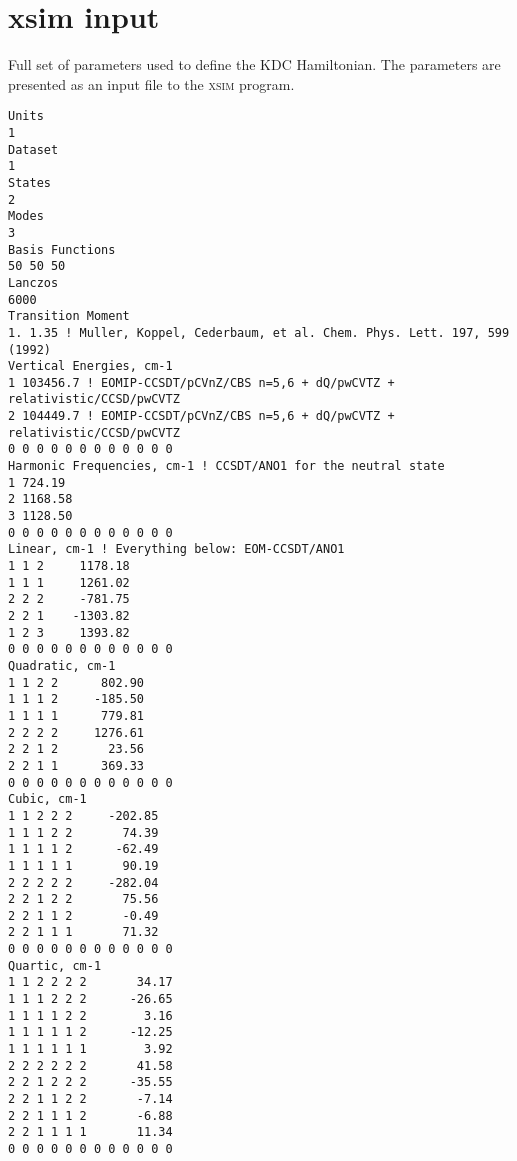 \documentclass[12pt,prb,aps]{revtex4-1}
\begin{document}
\section{xsim input}
Full set of parameters used to define the KDC Hamiltonian. The parameters are presented as an input file to the \textsc{xsim} program.
\begin{verbatim}
Units
1
Dataset
1
States
2
Modes
3
Basis Functions
50 50 50
Lanczos
6000
Transition Moment
1. 1.35 ! Muller, Koppel, Cederbaum, et al. Chem. Phys. Lett. 197, 599 (1992)
Vertical Energies, cm-1
1 103456.7 ! EOMIP-CCSDT/pCVnZ/CBS n=5,6 + dQ/pwCVTZ + relativistic/CCSD/pwCVTZ
2 104449.7 ! EOMIP-CCSDT/pCVnZ/CBS n=5,6 + dQ/pwCVTZ + relativistic/CCSD/pwCVTZ
0 0 0 0 0 0 0 0 0 0 0 0
Harmonic Frequencies, cm-1 ! CCSDT/ANO1 for the neutral state
1 724.19
2 1168.58
3 1128.50
0 0 0 0 0 0 0 0 0 0 0 0
Linear, cm-1 ! Everything below: EOM-CCSDT/ANO1
1 1 2     1178.18
1 1 1     1261.02
2 2 2     -781.75
2 2 1    -1303.82
1 2 3     1393.82
0 0 0 0 0 0 0 0 0 0 0 0
Quadratic, cm-1
1 1 2 2      802.90
1 1 1 2     -185.50
1 1 1 1      779.81
2 2 2 2     1276.61
2 2 1 2       23.56
2 2 1 1      369.33
0 0 0 0 0 0 0 0 0 0 0 0
Cubic, cm-1
1 1 2 2 2     -202.85
1 1 1 2 2       74.39
1 1 1 1 2      -62.49
1 1 1 1 1       90.19
2 2 2 2 2     -282.04
2 2 1 2 2       75.56
2 2 1 1 2       -0.49
2 2 1 1 1       71.32
0 0 0 0 0 0 0 0 0 0 0 0
Quartic, cm-1
1 1 2 2 2 2       34.17
1 1 1 2 2 2      -26.65
1 1 1 1 2 2        3.16
1 1 1 1 1 2      -12.25
1 1 1 1 1 1        3.92
2 2 2 2 2 2       41.58
2 2 1 2 2 2      -35.55
2 2 1 1 2 2       -7.14
2 2 1 1 1 2       -6.88
2 2 1 1 1 1       11.34
0 0 0 0 0 0 0 0 0 0 0 0
\end{verbatim}
\end{document}
